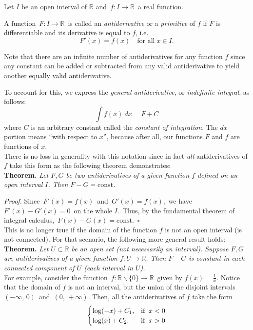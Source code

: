 \documentclass{article}
\begin{document}
Let $I$ be an open interval of $\mathbb{R}$ and\, $f:I \longrightarrow \mathbb{R}$\, a real function.

A function \,$F:I \longrightarrow \mathbb{R}$\, is called an \emph{antiderivative} or a \emph{primitive} of $f$ if $F$ is differentiable and its derivative is equal to $f$, i.e.
\begin{displaymath}
 F'(x) = f(x) \quad \text{for all}\; x \in I.
\end{displaymath}

Note that there are an infinite number of antiderivatives for any function $f$ since any constant can be added or subtracted from any valid antiderivative to yield another equally valid antiderivative.

To account for this, we express the \emph{general antiderivative}, or \emph{indefinite integral}, as follows:
$$ \int f(x)\ dx = F+C$$
where $C$ is an arbitrary constant called the \emph{constant of integration}.  The $dx$ portion means ``with respect to $x$'', because after all, our functions $F$ and $f$ are functions of $x$.\\

There is no loss in generality with this notation since in fact \emph{all} antiderivatives of $f$ take this form as the following theorem demonstrates:\\

{\bf Theorem.}  \emph{Let $F, G$ be two antiderivatives of a given function $f$ defined on an open interval $I$. Then $F-G = \textrm{const}$.}

\emph{Proof.}  Since\, $F'(x) = f(x)$\, and\, $G'(x) = f(x)$,\, we have\, $F'(x)-G'(x) = 0$\, on the whole $I$.\, Thus, by the fundamental theorem of integral calculus,\, $F(x)-G(x) = \textrm{const}$.\, $\square$\\

This is no longer true if the domain of the function $f$ is not an open interval (is not connected).  For that scenario, the following more general result holds:\\

{\bf Theorem.}  \emph{Let $U \subset \mathbb{R}$ be an open set (not necessarily an interval).  Suppose $F, G$ are antiderivatives of a given function $f:U \longrightarrow \mathbb{R}$.  Then $F-G$ is constant in each connected component of $U$ (each interval in $U$).}\\

For example, consider the function \,$f:\mathbb{R}\!\smallsetminus\!\{0\} \longrightarrow \mathbb{R}$\, given by $f(x) = \frac{1}{x}$. Notice that the domain of $f$ is not an interval, but the union of the disjoint intervals \,$(-\infty,\, 0)$\, and \,$(0,\,+\infty)$.  Then, all the antiderivatives of $f$ take the form
\begin{displaymath}
\begin{cases}
\log(-x) + C_1, & $if$\;\; x < 0\\
\log(x) + C_2, & $if$\;\; x > 0
\end{cases}
\end{displaymath}
\end{document}
